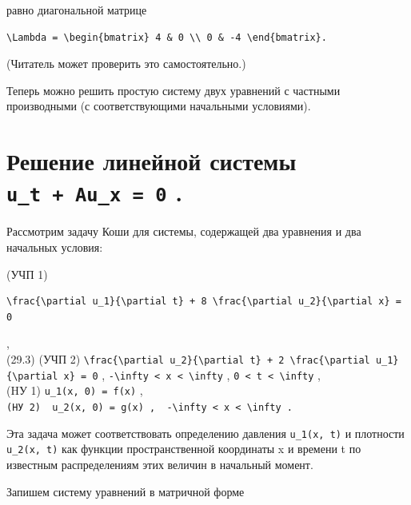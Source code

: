 \documentclass[
  ukrainian,
]{article}
\begin{document}
равно диагональной матрице

\begin{verbatim}
\Lambda = \begin{bmatrix} 4 & 0 \\ 0 & -4 \end{bmatrix}.
\end{verbatim}

(Читатель может проверить это самостоятельно.)

Теперь можно решить простую систему двух уравнений с частными
производными (с соответствующими начальными условиями).

\section{\texorpdfstring{Решение линейной системы
\texttt{u\_t\ +\ Au\_x\ =\ 0}
.}{Решение линейной системы u\_t + Au\_x = 0 .}}\label{ux440ux435ux448ux435ux43dux438ux435-ux43bux438ux43dux435ux439ux43dux43eux439-ux441ux438ux441ux442ux435ux43cux44b-u_t-au_x-0-.}

Рассмотрим задачу Коши для системы, содержащей два уравнения и два
начальных условия:

(УЧП 1)

\begin{verbatim}
\frac{\partial u_1}{\partial t} + 8 \frac{\partial u_2}{\partial x} = 0
\end{verbatim}

,\\
(29.3) (УЧП 2)
\texttt{\textbackslash{}frac\{\textbackslash{}partial\ u\_2\}\{\textbackslash{}partial\ t\}\ +\ 2\ \textbackslash{}frac\{\textbackslash{}partial\ u\_1\}\{\textbackslash{}partial\ x\}\ =\ 0}
,
\texttt{-\textbackslash{}infty\ \textless{}\ x\ \textless{}\ \textbackslash{}infty}
, \texttt{0\ \textless{}\ t\ \textless{}\ \textbackslash{}infty} ,\\
(HУ 1) \texttt{u\_1(x,\ 0)\ =\ f(x)} ,\\
\texttt{(HУ\ 2)\ \ \textquotesingle{}u\_2(x,\ 0)\ =\ g(x)\textquotesingle{}\ ,\ \ \textquotesingle{}-\textbackslash{}infty\ \textless{}\ x\ \textless{}\ \textbackslash{}infty\textquotesingle{}\ .}

Эта задача может соответствовать определению давления
\texttt{u\_1(x,\ t)} и плотности \texttt{u\_2(x,\ t)} как функции
пространственной координаты x и времени t по известным распределениям
этих величин в начальный момент.

Запишем систему уравнений в матричной форме
\end{document}
